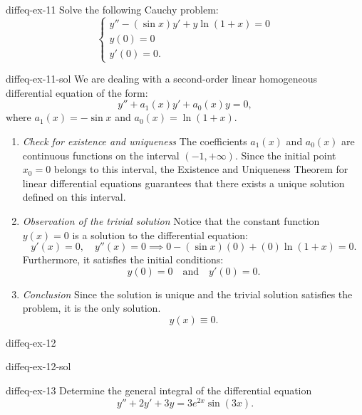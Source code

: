 \documentclass[preview]{standalone}
\begin{document}
\begin{snippetexercise}{diffeq-ex-11}{}
    Solve the following Cauchy problem:
    \[
        \begin{cases}
        y'' - (\sin x)y' + y \ln(1+x) = 0 \\
        y(0) = 0 \\
        y'(0) = 0.
        \end{cases}
    \]
\end{snippetexercise}

\begin{snippetsolution}{diffeq-ex-11-sol}{}
    We are dealing with a second-order linear homogeneous differential equation of the form:
    \[ y'' + a_1(x)y' + a_0(x)y = 0, \]
    where \( a_1(x) = -\sin x \) and \( a_0(x) = \ln(1+x) \).
    \begin{enumerate}
        \item \emph{Check for existence and uniqueness}
        The coefficients \( a_1(x) \) and \( a_0(x) \) are continuous functions on the interval \( (-1, +\infty) \). Since the initial point \( x_0 = 0 \) belongs to this interval, the Existence and Uniqueness Theorem for linear differential equations guarantees that there exists a unique solution defined on this interval.
        \item \emph{Observation of the trivial solution}
        Notice that the constant function \( y(x) = 0 \) is a solution to the differential equation:
        \[ y'(x) = 0, \quad y''(x) = 0 \implies 0 - (\sin x)(0) + (0)\ln(1+x) = 0. \]
        Furthermore, it satisfies the initial conditions:
        \[ y(0) = 0 \quad \text{and} \quad y'(0) = 0. \]
        \item \emph{Conclusion}
        Since the solution is unique and the trivial solution satisfies the problem, it is the only solution.
        \[ y(x) \equiv 0. \]
    \end{enumerate}
\end{snippetsolution}

\begin{snippetexercise}{diffeq-ex-12}{}
    \todo
\end{snippetexercise}

\begin{snippetsolution}{diffeq-ex-12-sol}{}
    \todo
\end{snippetsolution}

\begin{snippetexercise}{diffeq-ex-13}{}
    Determine the general integral of the differential equation
    \[ y'' + 2y' + 3y = 3e^{2x} \sin(3x). \]
\end{snippetexercise}
\end{document}
